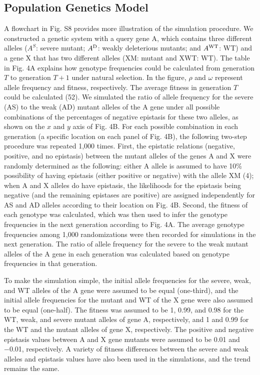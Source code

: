 \subsection{Population Genetics Model} A flowchart in Fig. S8 provides
more illustration of the simulation procedure. We constructed a
genetic system with a query gene A, which contains three different
alleles ($A^S$: severe mutant; $A^\textnormal{D}$: weakly deleterious
mutants; and $A^{\textnormal{WT}}$: WT) and a gene X that has two
different alleles (XM: mutant and XWT: WT). The table in Fig. 4A
explains how genotype frequencies could be calculated from generation
$T$ to generation $T+1$ under natural selection. In the figure, $\rho$
and $\omega$ represent allele frequency and fitness, respectively. The
average fitness in generation $T$ could be calculated (52).  We
simulated the ratio of allele frequency for the severe (AS) to the
weak (AD) mutant alleles of the A gene under all possible combinations
of the percentages of negative epistasis for these two alleles, as
shown on the $x$ and $y$ axis of Fig. 4B. For each possible
combination in each generation (a specific location on each panel of
Fig. 4B), the following two-step procedure was repeated 1,000
times. First, the epistatic relations (negative, positive, and no
epistasis) between the mutant alleles of the genes A and X were
randomly determined as the following: either A allele is assumed to
have 10\% possibility of having epistasis (either positive or
negative) with the allele XM (4); when A and X alleles do have
epistasis, the likelihoods for the epistasis being negative (and the
remaining epistases are positive) are assigned independently for AS
and AD alleles according to their location on Fig. 4B. Second, the
fitness of each genotype was calculated, which was then used to infer
the genotype frequencies in the next generation according to
Fig. 4A. The average genotype frequencies among 1,000 randomizations
were then recorded for simulations in the next generation. The ratio
of allele frequency for the severe to the weak mutant alleles of the A
gene in each generation was calculated based on genotype frequencies
in that generation.

To make the simulation simple, the initial allele frequencies for the
severe, weak, and WT alleles of the A gene were assumed to be equal
(one-third), and the initial allele frequencies for the mutant and WT
of the X gene were also assumed to be equal (one-half). The fitness
was assumed to be 1, 0.99, and 0.98 for the WT, weak, and severe
mutant alleles of gene A, respectively, and 1 and 0.99 for the WT and
the mutant alleles of gene X, respectively. The positive and negative
epistasis values between A and X gene mutants were assumed to be 0.01
and −0.01, respectively. A variety of fitness differences between the
severe and weak alleles and epistasis values have also been used in
the simulations, and the trend remains the same.

